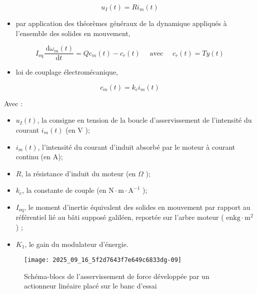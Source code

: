 $$
u_{I}(t)=R i_{m}(t)
$$

\begin{itemize}
  \item par application des théorèmes généraux de la dynamique appliqués à l'ensemble des solides en mouvement,
\end{itemize}

$$
I_{\mathrm{eq}} \frac{\mathrm{~d} \omega_{m}(t)}{\mathrm{d} t}=Q c_{m}(t)-c_{r}(t) \quad \text { avec } \quad c_{r}(t)=T y(t)
$$

\begin{itemize}
  \item loi de couplage électromécanique,
\end{itemize}

$$
c_{m}(t)=k_{c} i_{m}(t)
$$

Avec :

\begin{itemize}
  \item $u_{I}(t)$, la consigne en tension de la boucle d'asservissement de l'intensité du courant $i_{m}(t)$ (en V );
  \item $i_{m}(t)$, l'intensité du courant d'induit absorbé par le moteur à courant continu (en A);
  \item $R$, la résistance d'induit du moteur (en $\Omega$ );
  \item $k_{c}$, la constante de couple (en $\mathrm{N} \cdot \mathrm{m} \cdot \mathrm{A}^{-1}$ );
  \item $I_{\mathrm{eq}}$, le moment d'inertie équivalent des solides en mouvement par rapport au référentiel lié au bâti supposé galiléen, reportée sur l'arbre moteur ( $\mathrm{en} \mathrm{kg} \cdot \mathrm{m}^{2}$ ) ;
  \item $K_{1}$, le gain du modulateur d'énergie.
\end{itemize}



\begin{figure}[!h]
\centering
\texttt{[image: 2025\_09\_16\_5f2d7643f7e649c6833dg-09]}
\caption{\label{ccs_mp_2023_fig_11}  Schéma-blocs de l'asservissement de force développée par un actionneur linéaire placé sur le banc d'essai}
\end{figure}



